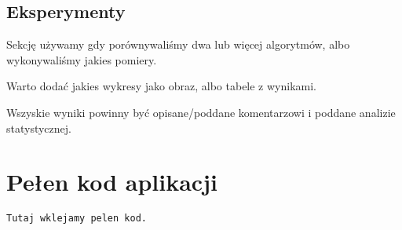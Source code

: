 \documentclass[12pt,a4paper]{article}
\begin{document}
	\subsection*{Eksperymenty}
	Sekcję używamy gdy porównywaliśmy dwa lub więcej algorytmów, albo wykonywaliśmy jakies pomiery.
	
	Warto dodać jakies wykresy jako obraz, albo tabele z wynikami. 
	
	Wszyskie wyniki powinny być opisane/poddane komentarzowi i poddane analizie statystycznej.
	\newpage
	\section*{Pełen kod aplikacji}
\begin{lstlisting}
Tutaj wklejamy pelen kod. 
\end{lstlisting}
\end{document}
